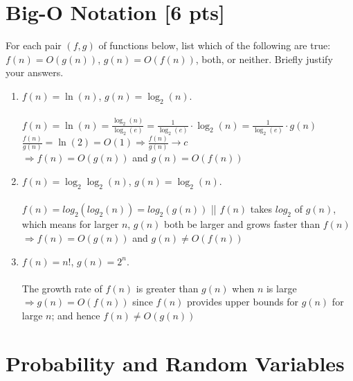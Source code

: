 \documentclass[a4paper]{article}
\theoremstyle{definition}
\newenvironment{soln}{
	\leavevmode\color{blue}\ignorespaces
}{}
\begin{document}
	
	\section{Big-O Notation [6 pts]}
	For each pair $(f, g)$ of functions below, list which of the following
	are true: $f(n) = O(g(n))$, $g(n) = O(f(n))$, both, or
	neither. Briefly justify your answers.
	\begin{enumerate}
		\item 	$f(n) = \ln(n)$, $g(n) = \log_{2}(n)$.\\
		\begin{soln}\\
		$f(n) = \ln(n) = \frac{\log_{2}(n)}{\log_{2}(e)} = \frac{1}{\log_{2}(e)} \cdot \log_{2}(n) = \frac{1}{\log_{2}(e)} \cdot g(n)$ \\
		$\frac{f(n)}{g(n)} = \ln(2) = O(1) \Rightarrow \frac{f(n)}{g(n)} \rightarrow c$\\
		$\Rightarrow f(n) = O(g(n))$ and $g(n) = O(f(n))$
		\end{soln}
		
		\item 	$f(n) =  \log_{2}\log_{2}(n)$, $g(n) = \log_{2}(n)$.\\
		\begin{soln}\\
		$f(n) = log_2(log_2(n)) = log_2(g(n))$ || $f(n)$ takes $log_2$ of $g(n)$, which means for larger $n$, $g(n)$ both be larger and grows faster than $f(n)$\\
		$\Rightarrow f(n) = O(g(n))$ and $g(n) \neq O(f(n))$
		\end{soln}
		
		\item 	$f(n) = n!$, $g(n) = 2^n$.\\
		\begin{soln}\\
		The growth rate of $f(n)$ is greater than $g(n)$ when $n$ is large \\
		$\Rightarrow g(n) = O(f(n)) $ since $f(n)$ provides upper bounds for $g(n)$ for large $n$; and hence  $f(n) \neq O(g(n))$ \end{soln}
	\end{enumerate}
	
	
	
	
	
	\section{Probability and Random Variables }
\end{document}
